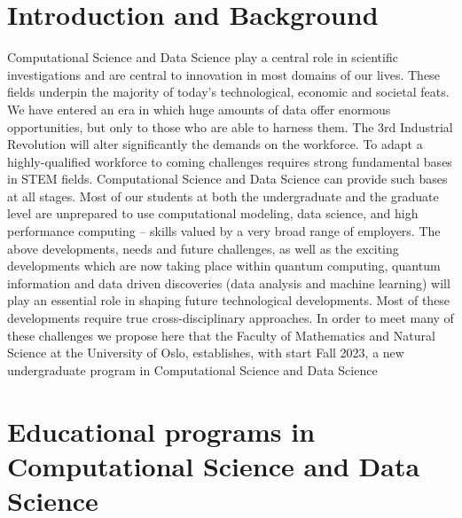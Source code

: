 \documentclass[oneside,final,10pt]{article}
\begin{document}
\section*{Introduction and Background}
Computational Science and Data Science play a central role in scientific investigations and are central to innovation in most domains of our lives. These fields underpin the majority of today's technological, economic and societal feats. We have entered an era in which huge amounts of data offer enormous opportunities, but only to those who are able to harness them. The 3rd Industrial Revolution will alter significantly the demands on the workforce. To adapt a highly-qualified workforce to coming challenges requires strong fundamental bases in STEM fields. Computational Science and Data Science can provide such bases at all stages. Most of our students at both the undergraduate and the graduate level are unprepared to use computational modeling, data science, and high performance computing – skills valued by a very broad range of employers. 
The above developments, needs and future challenges, as well as the exciting developments which are now taking place within quantum computing, quantum information and data driven discoveries (data analysis and machine learning) will play an essential role in shaping future technological developments. Most of these developments require true cross-disciplinary approaches.  In order to meet many of these challenges we propose here that the Faculty of Mathematics and Natural Science at the University of Oslo, establishes, with start Fall 2023, a new undergraduate program in Computational Science and Data Science


\section*{Educational programs in Computational Science and Data Science}
\end{document}
